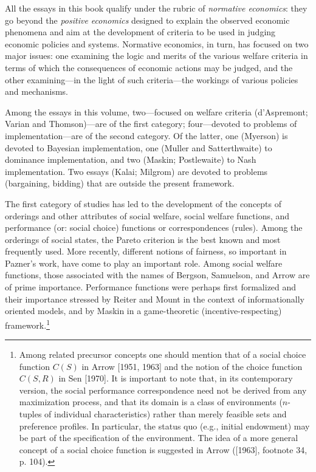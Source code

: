 \documentclass[12pt, letterpaper]{article}
\begin{document}
All the essays in this book qualify under the rubric of \textit{normative economics}: they go beyond the \textit{positive economics} designed to explain the observed economic phenomena and aim at the development of criteria to be used in judging economic policies and systems. Normative economics, in turn, has focused on two major issues: one examining the logic and merits of the various welfare criteria in terms of which the consequences of economic actions may be judged, and the other examining---in the light of such criteria---the workings of various policies and mechanisms.

Among the essays in this volume, two---focused on welfare criteria (d'Aspremont; Varian and Thomson)---are of the first category; four---devoted to problems of implementation---are of the second category. Of the latter, one (Myerson) is devoted to Bayesian implementation, one (Muller and Satterthwaite) to dominance implementation, and two (Maskin; Postlewaite) to Nash implementation. Two essays (Kalai; Milgrom) are devoted to problems (bargaining, bidding) that are outside the present framework.

The first category of studies has led to the development of the concepts of orderings and other attributes of social welfare, social welfare functions, and performance (or: social choice) functions or correspondences (rules). Among the orderings of social states, the Pareto criterion is the best known and most frequently used. More recently, different notions of fairness, so important in Pazner's work, have come to play an important role. Among social welfare functions, those associated with the names of Bergson, Samuelson, and Arrow are of prime importance. Performance functions were perhaps first formalized and their importance stressed by Reiter and Mount in the context of informationally oriented models, and by Maskin in a game-theoretic (incentive-respecting) framework.\footnote{Among related precursor concepts one should mention that of a social choice function $C(S)$ in Arrow [1951, 1963] and the notion of the choice function $C(S, R)$ in Sen [1970]. It is important to note that, in its contemporary version, the social performance correspondence need not be derived from any maximization process, and that its domain is a class of environments ($n$-tuples of individual characteristics) rather than merely feasible sets and preference profiles. In particular, the status quo (e.g., initial endowment) may be part of the specification of the environment. The idea of a more general concept of a social choice function is suggested in Arrow ([1963], footnote 34, p. 104).}
\end{document}
